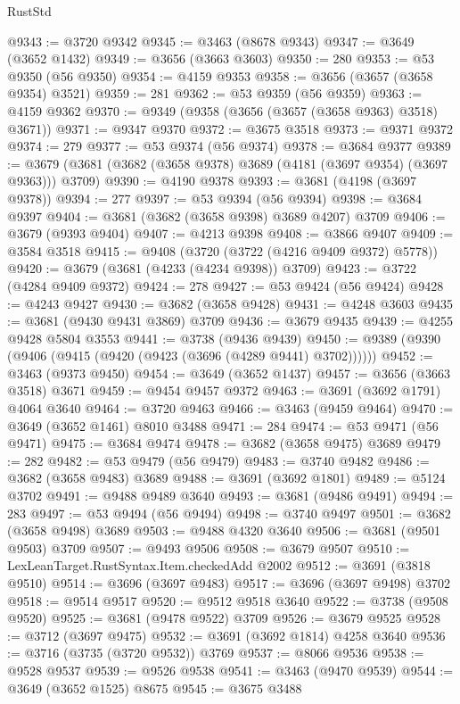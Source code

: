 \begin{lexlean}{RustStd}
\begin{coremodule}
@9343 := @3720 @9342
@9345 := @3463 (@8678 @9343)
@9347 := @3649 (@3652 @1432)
@9349 := @3656 (@3663 @3603)
@9350 := 280
@9353 := @53 @9350 (@56 @9350)
@9354 := @4159 @9353
@9358 := @3656 (@3657 (@3658 @9354) @3521)
@9359 := 281
@9362 := @53 @9359 (@56 @9359)
@9363 := @4159 @9362
@9370 := @9349 (@9358 (@3656 (@3657 (@3658 @9363) @3518) @3671))
@9371 := @9347 @9370
@9372 := @3675 @3518
@9373 := @9371 @9372
@9374 := 279
@9377 := @53 @9374 (@56 @9374)
@9378 := @3684 @9377
@9389 := @3679 (@3681 (@3682 (@3658 @9378) @3689 (@4181 (@3697 @9354) (@3697 @9363))) @3709)
@9390 := @4190 @9378
@9393 := @3681 (@4198 (@3697 @9378))
@9394 := 277
@9397 := @53 @9394 (@56 @9394)
@9398 := @3684 @9397
@9404 := @3681 (@3682 (@3658 @9398) @3689 @4207) @3709
@9406 := @3679 (@9393 @9404)
@9407 := @4213 @9398
@9408 := @3866 @9407
@9409 := @3584 @3518
@9415 := @9408 (@3720 (@3722 (@4216 @9409 @9372) @5778))
@9420 := @3679 (@3681 (@4233 (@4234 @9398)) @3709)
@9423 := @3722 (@4284 @9409 @9372)
@9424 := 278
@9427 := @53 @9424 (@56 @9424)
@9428 := @4243 @9427
@9430 := @3682 (@3658 @9428)
@9431 := @4248 @3603
@9435 := @3681 (@9430 @9431 @3869) @3709
@9436 := @3679 @9435
@9439 := @4255 @9428 @5804 @3553
@9441 := @3738 (@9436 @9439)
@9450 := @9389 (@9390 (@9406 (@9415 (@9420 (@9423 (@3696 (@4289 @9441) @3702))))))
@9452 := @3463 (@9373 @9450)
@9454 := @3649 (@3652 @1437)
@9457 := @3656 (@3663 @3518) @3671
@9459 := @9454 @9457 @9372
@9463 := @3691 (@3692 @1791) @4064 @3640
@9464 := @3720 @9463
@9466 := @3463 (@9459 @9464)
@9470 := @3649 (@3652 @1461) @8010 @3488
@9471 := 284
@9474 := @53 @9471 (@56 @9471)
@9475 := @3684 @9474
@9478 := @3682 (@3658 @9475) @3689
@9479 := 282
@9482 := @53 @9479 (@56 @9479)
@9483 := @3740 @9482
@9486 := @3682 (@3658 @9483) @3689
@9488 := @3691 (@3692 @1801)
@9489 := @5124 @3702
@9491 := @9488 @9489 @3640
@9493 := @3681 (@9486 @9491)
@9494 := 283
@9497 := @53 @9494 (@56 @9494)
@9498 := @3740 @9497
@9501 := @3682 (@3658 @9498) @3689
@9503 := @9488 @4320 @3640
@9506 := @3681 (@9501 @9503) @3709
@9507 := @9493 @9506
@9508 := @3679 @9507
@9510 := LexLeanTarget.RustSyntax.Item.checkedAdd @2002
@9512 := @3691 (@3818 @9510)
@9514 := @3696 (@3697 @9483)
@9517 := @3696 (@3697 @9498) @3702
@9518 := @9514 @9517
@9520 := @9512 @9518 @3640
@9522 := @3738 (@9508 @9520)
@9525 := @3681 (@9478 @9522) @3709
@9526 := @3679 @9525
@9528 := @3712 (@3697 @9475)
@9532 := @3691 (@3692 @1814) @4258 @3640
@9536 := @3716 (@3735 (@3720 @9532)) @3769
@9537 := @8066 @9536
@9538 := @9528 @9537
@9539 := @9526 @9538
@9541 := @3463 (@9470 @9539)
@9544 := @3649 (@3652 @1525) @8675
@9545 := @3675 @3488

\end{coremodule}
\end{lexlean}
